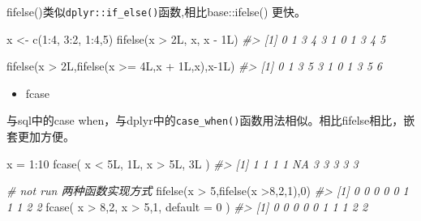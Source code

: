 \documentclass[
]{book}
\newenvironment{Shaded}{\begin{snugshade}}{\end{snugshade}}
\newcommand{\AttributeTok}[1]{\textcolor[rgb]{0.77,0.63,0.00}{#1}}
\newcommand{\CommentTok}[1]{\textcolor[rgb]{0.56,0.35,0.01}{\textit{#1}}}
\newcommand{\DecValTok}[1]{\textcolor[rgb]{0.00,0.00,0.81}{#1}}
\newcommand{\FunctionTok}[1]{\textcolor[rgb]{0.00,0.00,0.00}{#1}}
\newcommand{\NormalTok}[1]{#1}
\newcommand{\OtherTok}[1]{\textcolor[rgb]{0.56,0.35,0.01}{#1}}
\newcommand{\SpecialCharTok}[1]{\textcolor[rgb]{0.00,0.00,0.00}{#1}}
\providecommand{\tightlist}{%
  \setlength{\itemsep}{0pt}\setlength{\parskip}{0pt}}
\begin{document}
fifelse()类似\texttt{dplyr::if\_else()}函数,相比base::ifelse() 更快。

\begin{Shaded}
\begin{Highlighting}[]
\NormalTok{x }\OtherTok{\textless{}{-}}  \FunctionTok{c}\NormalTok{(}\DecValTok{1}\SpecialCharTok{:}\DecValTok{4}\NormalTok{, }\DecValTok{3}\SpecialCharTok{:}\DecValTok{2}\NormalTok{, }\DecValTok{1}\SpecialCharTok{:}\DecValTok{4}\NormalTok{,}\DecValTok{5}\NormalTok{)}
\FunctionTok{fifelse}\NormalTok{(x }\SpecialCharTok{\textgreater{}}\NormalTok{ 2L, x, x }\SpecialCharTok{{-}}\NormalTok{ 1L)}
\CommentTok{\#\textgreater{}  [1] 0 1 3 4 3 1 0 1 3 4 5}

\FunctionTok{fifelse}\NormalTok{(x }\SpecialCharTok{\textgreater{}}\NormalTok{ 2L,}\FunctionTok{fifelse}\NormalTok{(x }\SpecialCharTok{\textgreater{}=}\NormalTok{ 4L,x }\SpecialCharTok{+}\NormalTok{ 1L,x),x}\SpecialCharTok{{-}}\NormalTok{1L)}
\CommentTok{\#\textgreater{}  [1] 0 1 3 5 3 1 0 1 3 5 6}
\end{Highlighting}
\end{Shaded}

\begin{itemize}
\tightlist
\item
  fcase
\end{itemize}

与sql中的case when，与dplyr中的\texttt{case\_when()}函数用法相似。相比fifelse相比，嵌套更加方便。

\begin{Shaded}
\begin{Highlighting}[]
\NormalTok{x }\OtherTok{=} \DecValTok{1}\SpecialCharTok{:}\DecValTok{10}
\FunctionTok{fcase}\NormalTok{(}
\NormalTok{    x }\SpecialCharTok{\textless{}}\NormalTok{ 5L, 1L,}
\NormalTok{    x }\SpecialCharTok{\textgreater{}}\NormalTok{ 5L, 3L}
\NormalTok{)}
\CommentTok{\#\textgreater{}  [1]  1  1  1  1 NA  3  3  3  3  3}

\CommentTok{\# not run 两种函数实现方式}
\FunctionTok{fifelse}\NormalTok{(x }\SpecialCharTok{\textgreater{}} \DecValTok{5}\NormalTok{,}\FunctionTok{fifelse}\NormalTok{(x }\SpecialCharTok{\textgreater{}}\DecValTok{8}\NormalTok{,}\DecValTok{2}\NormalTok{,}\DecValTok{1}\NormalTok{),}\DecValTok{0}\NormalTok{)}
\CommentTok{\#\textgreater{}  [1] 0 0 0 0 0 1 1 1 2 2}
\FunctionTok{fcase}\NormalTok{(}
\NormalTok{  x }\SpecialCharTok{\textgreater{}} \DecValTok{8}\NormalTok{,}\DecValTok{2}\NormalTok{,}
\NormalTok{  x }\SpecialCharTok{\textgreater{}} \DecValTok{5}\NormalTok{,}\DecValTok{1}\NormalTok{,}
  \AttributeTok{default =} \DecValTok{0}
\NormalTok{)}
\CommentTok{\#\textgreater{}  [1] 0 0 0 0 0 1 1 1 2 2}
\end{Highlighting}
\end{Shaded}
\end{document}
